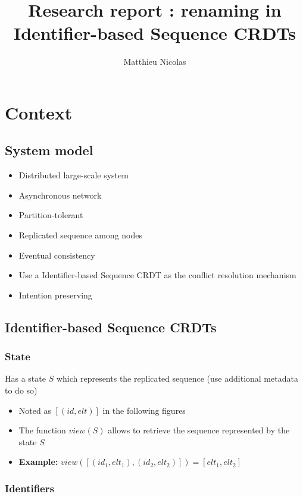 \documentclass[a4paper]{article}
\title{Research report : renaming in Identifier-based Sequence \acfp{CRDT}}
\author{Matthieu Nicolas}
\begin{document}
\maketitle
\thispagestyle{empty}

\section{Context}

\subsection{System model}

\begin{itemize}
  \item Distributed large-scale system
  \item Asynchronous network
  \item Partition-tolerant
  \item Replicated sequence among nodes
  \item Eventual consistency
  \item Use a Identifier-based Sequence \ac{CRDT} as the conflict resolution mechanism
  \item Intention preserving
\end{itemize}

\subsection{Identifier-based Sequence \acfp{CRDT}}

\subsubsection{State}

Has a state $S$ which represents the replicated sequence (use additional metadata to do so)
\begin{itemize}
  \item Noted as $[(id, elt)]$ in the following figures
  \item The function $view(S)$ allows to retrieve the sequence represented by the state $S$
  \item \textbf{Example:} $view([(id_1, elt_1), (id_2, elt_2)]) = [elt_1, elt_2]$
\end{itemize}

\subsubsection{Identifiers}
\end{document}

